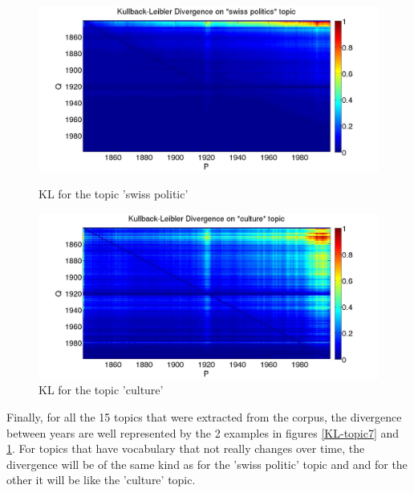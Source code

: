 \begin{figure}[h!]
    \begin{minipage}[b]{0.48\linewidth}
        \includegraphics[scale=0.15]{Pictures/topics/kullback-leibler/KL_topic7.jpg}
        \caption{KL for the topic 'swiss politic'}
        \label{KL-topic7}
    \end{minipage}\hfill
    \begin{minipage}[b]{0.5\linewidth}
        \includegraphics[scale=0.15]{Pictures/topics/kullback-leibler/KL_topic1.jpg}
        \caption{KL for the topic 'culture'}
        \label{KL-topic1}
    \end{minipage}\hfill
\end{figure}

Finally, for all the 15 topics that were extracted from the corpus, the divergence between years are well represented by the 2 examples in figures \ref{KL-topic7} and \ref{KL-topic1}. For topics that have vocabulary that not really changes over time, the divergence will be of the same kind as for the 'swiss politic' topic and and for the other it will be like the 'culture' topic.